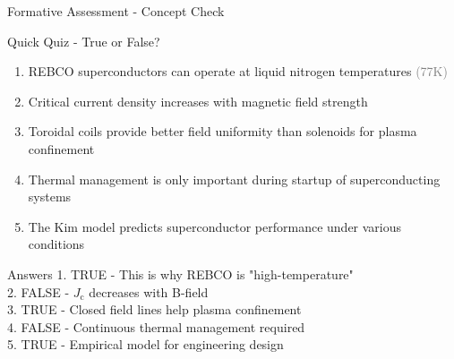 \documentclass[aspectratio=169,xcolor={table,dvipsnames}]{beamer}
\newcommand{\Jc}{J_\text{c}}
\begin{document}
\begin{frame}{Formative Assessment - Concept Check}
    \begin{block}{Quick Quiz - True or False?}
        \begin{enumerate}
            \item REBCO superconductors can operate at liquid nitrogen temperatures \textcolor{gray}{(77K)}
            \item Critical current density increases with magnetic field strength
            \item Toroidal coils provide better field uniformity than solenoids for plasma confinement
            \item Thermal management is only important during startup of superconducting systems
            \item The Kim model predicts superconductor performance under various conditions
        \end{enumerate}
    \end{block}
    
    \pause
    \begin{alertblock}{Answers}
        1. \textcolor{green!50!black}{TRUE} - This is why REBCO is "high-temperature" \\
        2. \textcolor{red!80!black}{FALSE} - $\Jc$ decreases with B-field \\
        3. \textcolor{green!50!black}{TRUE} - Closed field lines help plasma confinement \\
        4. \textcolor{red!80!black}{FALSE} - Continuous thermal management required \\
        5. \textcolor{green!50!black}{TRUE} - Empirical model for engineering design
    \end{alertblock}
\end{frame}
\end{document}
